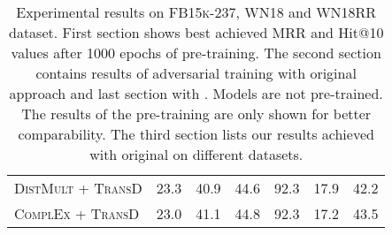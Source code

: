 \begin{table}[h]
\begin{tabular}{lllllll}
          \textsc{DistMult} + \textsc{TransD}
          & 23.3 
          & 40.9 
          & 44.6 
          & 92.3
          & 17.9 
          & 42.2 \\
        
         \textsc{ComplEx} + \textsc{TransD}
          & 23.0  
          & 41.1 
          & 44.8 
          & 92.3 
          & 17.2 
          & 43.5 \\
          
        \bottomrule
    \end{tabular}
    \caption{Experimental results on \textsc{FB15k-237}, \textsc{WN18} and \textsc{WN18RR} dataset.
    First section shows best achieved MRR and Hit@10 values after 1000 epochs of pre-training.
    The second section contains results of adversarial training with original \kbgan approach and last section with \usgan.
    Models are not pre-trained. 
    The results of the pre-training are only shown for better comparability.
    The third section lists our results achieved with original \kbgan on different datasets.}
\label{tab:results}
\end{table}
